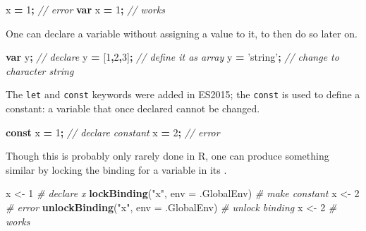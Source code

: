 \documentclass[10pt,]{krantz}
\makeatletter
\newenvironment{Shaded}{\begin{snugshade}}{\end{snugshade}}
\newcommand{\CommentTok}[1]{\textcolor[rgb]{0.37,0.37,0.37}{\textit{#1}}}
\newcommand{\DataTypeTok}[1]{\textcolor[rgb]{0.27,0.27,0.27}{#1}}
\newcommand{\DecValTok}[1]{\textcolor[rgb]{0.06,0.06,0.06}{#1}}
\newcommand{\KeywordTok}[1]{\textcolor[rgb]{0.27,0.27,0.27}{\textbf{#1}}}
\newcommand{\NormalTok}[1]{#1}
\newcommand{\OperatorTok}[1]{\textcolor[rgb]{0.43,0.43,0.43}{\textbf{#1}}}
\newcommand{\StringTok}[1]{\textcolor[rgb]{0.5,0.5,0.5}{#1}}
\newenvironment{kframe}{%
\medskip{}
\setlength{\fboxsep}{.8em}
 \def\at@end@of@kframe{}%
 \ifinner\ifhmode%
  \def\at@end@of@kframe{\end{minipage}}%
  \begin{minipage}{\columnwidth}%
 \fi\fi%
 \def\FrameCommand##1{\hskip\@totalleftmargin \hskip-\fboxsep
 \colorbox{shadecolor}{##1}\hskip-\fboxsep
     \hskip-\linewidth \hskip-\@totalleftmargin \hskip\columnwidth}%
 \MakeFramed {\advance\hsize-\width
   \@totalleftmargin\z@ \linewidth\hsize
   \@setminipage}}%
 {\par\unskip\endMakeFramed%
 \at@end@of@kframe}
\renewenvironment{Shaded}{\begin{kframe}}{\end{kframe}}
\makeatother
\begin{document}
\begin{Shaded}
\begin{Highlighting}[]
\NormalTok{x }\OperatorTok{=} \DecValTok{1}\OperatorTok{;} \CommentTok{// error}
\KeywordTok{var}\NormalTok{ x }\OperatorTok{=} \DecValTok{1}\OperatorTok{;} \CommentTok{// works}
\end{Highlighting}
\end{Shaded}

One can declare a variable without assigning a value to it, to then do so later on.

\begin{Shaded}
\begin{Highlighting}[]
\KeywordTok{var}\NormalTok{ y}\OperatorTok{;} \CommentTok{// declare }
\NormalTok{y }\OperatorTok{=}\NormalTok{ [}\DecValTok{1}\OperatorTok{,}\DecValTok{2}\OperatorTok{,}\DecValTok{3}\NormalTok{]}\OperatorTok{;} \CommentTok{// define it as array}
\NormalTok{y }\OperatorTok{=} \StringTok{'string'}\OperatorTok{;} \CommentTok{// change to character string}
\end{Highlighting}
\end{Shaded}

The \texttt{let} and \texttt{const} keywords were added in ES2015; the \texttt{const} is used to define a constant: a variable that once declared cannot be changed.

\begin{Shaded}
\begin{Highlighting}[]
\KeywordTok{const}\NormalTok{ x }\OperatorTok{=} \DecValTok{1}\OperatorTok{;} \CommentTok{// declare constant}
\NormalTok{x }\OperatorTok{=} \DecValTok{2}\OperatorTok{;} \CommentTok{// error}
\end{Highlighting}
\end{Shaded}

Though this is probably only rarely done in R, one can produce something similar by locking the binding for a variable in its .

\begin{Shaded}
\begin{Highlighting}[]
\NormalTok{x <-}\StringTok{ }\DecValTok{1} \CommentTok{# declare x}
\KeywordTok{lockBinding}\NormalTok{(}\StringTok{"x"}\NormalTok{, }\DataTypeTok{env =}\NormalTok{ .GlobalEnv) }\CommentTok{# make constant}
\NormalTok{x <-}\StringTok{ }\DecValTok{2} \CommentTok{# error}
\KeywordTok{unlockBinding}\NormalTok{(}\StringTok{"x"}\NormalTok{, }\DataTypeTok{env =}\NormalTok{ .GlobalEnv) }\CommentTok{# unlock binding}
\NormalTok{x <-}\StringTok{ }\DecValTok{2} \CommentTok{# works}
\end{Highlighting}
\end{Shaded}
\end{document}

